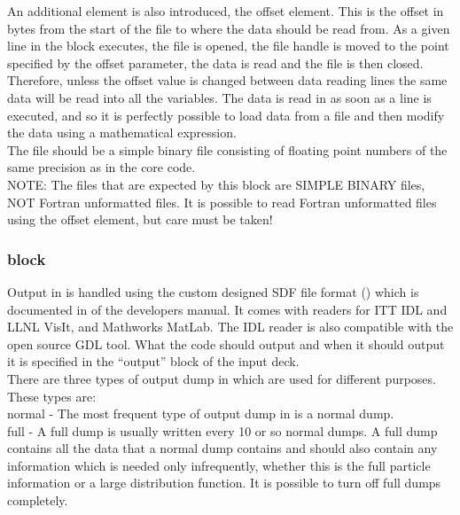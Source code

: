 An additional element is also introduced, the offset element. This
is the offset in bytes from the start of the file to where the data should
be read from. As a given line in the block executes, the file is opened, the
file handle is moved to the point specified by the offset parameter, the data
is read and the file is then closed. Therefore, unless the offset value is
changed between data reading lines the same data will be read into all the
variables. The data is read in as soon as a line is executed, and so it is
perfectly possible to load data from a file and then modify the data using
a mathematical expression.\\

The file should be a simple binary file consisting of floating point numbers of
the same precision as  in the core {\EPOCH} code.\\

{\emphtext NOTE: The files that are expected by this block are SIMPLE BINARY
files, NOT Fortran unformatted files. It is possible to read Fortran
unformatted files using the offset element, but care must be taken!}\\


\subsubsection{ block}
\label{sec:output block}
Output in {\EPOCH} is handled using the custom designed SDF file format
() which is documented in 
of the developers manual.
It comes with readers for ITT IDL and LLNL VisIt, and Mathworks MatLab.
The IDL reader is also compatible with the open source GDL tool.
What the code should output and when it should output it is
specified in the ``output'' block of the input deck. \\

There are three types of output dump in {\EPOCH} which are used for different
purposes. These types are:\\

{\emphtext normal} - The most frequent type of output dump in {\EPOCH} is a
normal dump.\\

{\emphtext full} - A full dump is usually written every 10 or so normal
dumps. A full dump contains all the data that a normal dump contains and should
also contain any information which is needed only infrequently, whether this is
the full particle information or a large distribution function. It is possible
to turn off full dumps completely.\\

